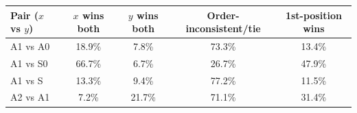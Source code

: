 \begin{tabular}{lcccc}
\toprule
Pair ($x$ vs $y$) & $x$ wins both & $y$ wins both & Order-inconsistent/tie & 1st-position wins \\
\midrule
A1 vs A0 & 18.9\% & 7.8\% & 73.3\% & 13.4\% \\
A1 vs S0 & 66.7\% & 6.7\% & 26.7\% & 47.9\% \\
A1 vs S & 13.3\% & 9.4\% & 77.2\% & 11.5\% \\
A2 vs A1 & 7.2\% & 21.7\% & 71.1\% & 31.4\% \\
\bottomrule
\end{tabular}